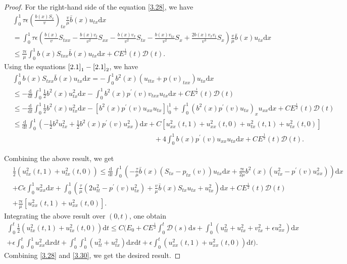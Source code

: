 \documentclass[10pt,reqno]{amsart}
\numberwithin{equation}{section}
\newcommand{\dif}{\mathrm{d}}
\begin{document}
\begin{proof}
For the right-hand side of the equation \eqref{3.28}, we have
\begin{align*}
&\int_0^1 \tau \epsilon \left(\frac{b(x)S_x}{v}\right)_{tx} \frac{v}{\mu} \bar b(x)u_{tx}\dif x \\
&=\int_0^1 \tau \epsilon \left( \frac{b(x)}{v}S_{txx}-\frac{ b(x) v_t}{v^2}S_{xx}-\frac{b(x) v_x}{v^2} S_{tx}-\frac{b(x)v_{tx}}{v^2}S_x+\frac{2 b(x)v_x v_t}{v^3} S_x\right)\frac{v}{\mu} \bar b(x)u_{tx}\dif x\\
&\le \frac{\tau \epsilon}{\mu} \int_0^1 b(x) S_{txx} \bar b(x) u_{tx} \dif x  +CE^\frac{1}{2}(t)\mathcal D(t).
\end{align*}
Using the  equations $\eqref{2.1}_1-\eqref{2.1}_2$, we have
\begin{align*}
&\int_0^1 b(x) S_{txx} \bar b(x) u_{tx}\dif x=-\int_0^1 b^2(x)(u_{ttx}+p(v)_{txx})u_{tx}\dif x\\
&\le -\frac{\dif}{\dif t}\int_0^1 \frac{1}{2}b^2(x) u_{tx}^2\dif x-\int_0^1 b^2(x)p^\prime(v) v_{txx}u_{tx} \dif x+CE^\frac{1}{2}(t)\mathcal D(t)\\
&\le -\frac{\dif}{\dif t} \int_0^1 \frac{1}{2} b^2(x)u_{tx}^2 \dif x-\left[b^2(x)p^\prime(v) u_{xx}u_{tx} \right]\big|_0^1+\int_0^1 (b^2(x)p^\prime(v) u_{tx})_x u_{xx}\dif x +CE^\frac{1}{2}(t)\mathcal D(t)\\
&\le \frac{\dif}{\dif t} \int_0^1 (-\frac{1}{2} b^2 u_{tx}^2+\frac{1}{2} b^2(x)p^\prime(v) u_{xx}^2)\dif x+C[ u_{xx}^2(t,1)+u_{xx}^2(t,0)+u_{tx}^2(t,1)+u_{tx}^2(t,0)]\\
&\qquad\qquad\qquad\qquad\qquad\qquad\qquad\qquad\qquad\qquad+4\int_0^1 b(x)p^\prime(v) u_{xx}u_{tx}\dif x+CE^\frac{1}{2}(t)\mathcal D(t).
\end{align*}

Combining the above result, we get
\begin{align*}
&\frac{1}{2} (u_{tx}^2(t,1)+u_{tx}^2(t,0))\le \frac{\dif}{\dif t} \int_0^1 \left(-\frac{\tau}{\mu} \bar b(x) (S_{tx}-p_{tx}(v))u_{tx}\dif x+\frac{\tau \epsilon}{2\mu} b^2(x)(u_{tx}^2-p^\prime(v) u_{xx}^2)\right)\dif x\\
&+C\epsilon\int_0^1 u_{xx}^2 \dif x+ \int_0^1\left( \frac{\tau}{\mu}(2 u_{tt}^2-p^\prime(v) u_{tx}^2 )+ \frac{v}{\mu} \bar b(x) S_{tx} u_{tx}+ u_{tx}^2\right) \dif x+C E^\frac{1}{2}(t)\mathcal D(t)\\
&+\frac{\tau\epsilon}{\mu} [ u_{xx}^2(t,1)+u_{xx}^2(t,0)].
\end{align*}
Integrating the above result over $(0, t)$, one obtain
\begin{align}
\int_0^t \frac{1}{2}( u_{tx}^2(t, 1)+u_{tx}^2(t, 0) )\dif t 
\le C(E_0+CE^\frac{1}{2}\int_0^t \mathcal D(s)\dif s+\int_0^1 (u_{tt}^2+u_{tx}^2+v_{tx}^2+\epsilon u_{xx}^2)\dif x \nonumber\\
+ \epsilon \int_0^t \int_0^1 u_{xx}^2 \dif x \dif t + \int_0^t\int_0^1 (u_{tt}^2+u_{tx}^2)\dif x \dif t 
+\epsilon \int_0^t ( u_{xx}^2(t,1)+u_{xx}^2(t,0)) \dif t) . \label{3.30}
\end{align}
Combining \eqref{3.28} and \eqref{3.30},  we get the desired result.
\end{proof}
\end{document}
